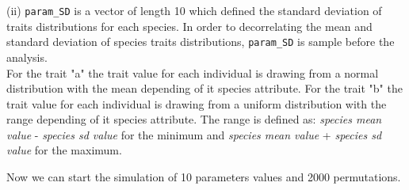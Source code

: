 \documentclass[12pt]{article}\usepackage[]{graphicx}\usepackage[]{color}
\begin{document}
(ii) \texttt{param\_{}SD} is a vector of length 10 which defined the standard deviation of traits distributions for each species. In order to decorrelating the mean and standard deviation of species traits distributions, \texttt{param\_{}SD} is sample before the analysis. 
\\

For the trait "a" the trait value for each individual is drawing from a normal distribution with the mean depending of it species attribute. For the trait "b" the trait value for each individual is drawing from a uniform distribution with the range depending of it species attribute. The range is defined as: \textit{species mean value} - \textit{species sd value} for the minimum and \textit{species mean value} + \textit{species sd value} for the maximum.

Now we can start the simulation of 10 parameters values and 2000 permutations. 
\end{document}
